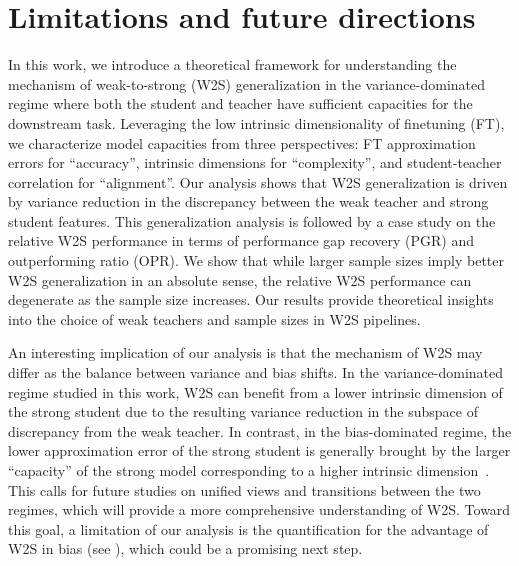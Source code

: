 \section{Limitations and future directions}
In this work, we introduce a theoretical framework for understanding the mechanism of weak-to-strong (W2S) generalization in the variance-dominated regime where both the student and teacher have sufficient capacities for the downstream task. Leveraging the low intrinsic dimensionality of finetuning (FT), we characterize model capacities from three perspectives: FT approximation errors for ``accuracy'', intrinsic dimensions for ``complexity'', and student-teacher correlation for ``alignment''. Our analysis shows that W2S generalization is driven by variance reduction in the discrepancy between the weak teacher and strong student features. 
This generalization analysis is followed by a case study on the relative W2S performance in terms of performance gap recovery (PGR) and outperforming ratio (OPR). We show that while larger sample sizes imply better W2S generalization in an absolute sense, the relative W2S performance can degenerate as the sample size increases.
Our results provide theoretical insights into the choice of weak teachers and sample sizes in W2S pipelines. 

An interesting implication of our analysis is that the mechanism of W2S may differ as the balance between variance and bias shifts. In the variance-dominated regime studied in this work, W2S can benefit from a lower intrinsic dimension of the strong student due to the resulting variance reduction in the subspace of discrepancy from the weak teacher. In contrast, in the bias-dominated regime, the lower approximation error of the strong student is generally brought by the larger ``capacity'' of the strong model corresponding to a higher intrinsic dimension~\citep{ildiz2024high,wu2024provable}. 
This calls for future studies on unified views and transitions between the two regimes, which will provide a more comprehensive understanding of W2S.
Toward this goal, a limitation of our analysis is the quantification for the advantage of W2S in bias (see ), which could be a promising next step.
